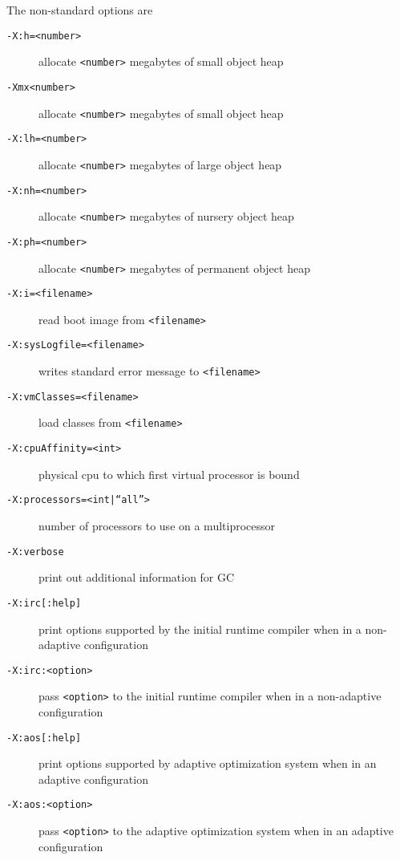 The non-standard options are

\begin{description}
\item[{\tt -X:h=<number>}]
allocate {\tt <number>} megabytes of small object heap

\item[{\tt -Xmx<number>}]
allocate {\tt <number>} megabytes of small object heap

\item[{\tt -X:lh=<number>}]
allocate {\tt <number>} megabytes of large object heap

\item[{\tt -X:nh=<number>}]
allocate {\tt <number>} megabytes of nursery object heap 

\item[{\tt -X:ph=<number>}]
allocate {\tt <number>} megabytes of permanent object heap 

\item[{\tt -X:i=<filename>}]
read boot image from {\tt <filename>}

\item[{\tt -X:sysLogfile=<filename>}]
writes standard error message to {\tt <filename>}

\item[{\tt -X:vmClasses=<filename>}]
load classes from {\tt <filename>}

\item[{\tt -X:cpuAffinity=<int>}]
physical cpu to which first virtual processor is bound

\item[{\tt -X:processors=<int|``all''>}]
number of processors to use on a multiprocessor

\item[{\tt -X:verbose}]
print out additional information for GC

\item[{\tt -X:irc[:help]}]
print options supported by the initial runtime compiler when in a non-adaptive
configuration 

\item[{\tt -X:irc:<option>}]
pass {\tt <option>} to the initial runtime compiler when in a non-adaptive configuration 

\item[{\tt -X:aos[:help]}]
print options supported by adaptive optimization system when in an
adaptive configuration

\item[{\tt -X:aos:<option>}]
pass {\tt <option>} to the adaptive optimization system when in an adaptive configuration


\end{description}

